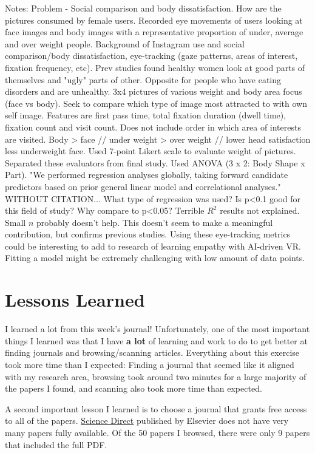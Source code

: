 \documentclass[a4paper]{article}
\begin{document}
\begin{enumerate}
    Notes: Problem - Social comparison and body dissatisfaction. How are the pictures consumed by female users. Recorded eye movements of users looking at face images and body images with a representative proportion of under, average and over weight people. Background of Instagram use and social comparison/body dissatisfaction, eye-tracking (gaze patterns, areas of interest, fixation frequency, etc). Prev studies found healthy women look at good parts of themselves and "ugly" parts of other. Opposite for people who have eating disorders and are unhealthy. 3x4 pictures of various weight and body area focus (face vs body). Seek to compare which type of image most attracted to with own self image. Features are first pass time, total fixation duration (dwell time), fixation count and visit count. Does not include order in which area of interests are visited. Body > face // under weight > over weight // lower head satisfaction less underweight face. Used 7-point Likert scale to evaluate weight of pictures. Separated these evaluators from final study. Used ANOVA (3 x 2: Body Shape x Part). "We performed regression analyses globally, taking forward candidate predictors based on prior general linear model and correlational analyses." WITHOUT CITATION... What type of regression was used? Is p<0.1 good for this field of study? Why compare to p<0.05? Terrible $R^2$ results not explained. Small $n$ probably doesn't help. This doesn't seem to make a meaningful contribution, but confirms previous studies. Using these eye-tracking metrics could be interesting to add to research of learning empathy with AI-driven VR. Fitting a model might be extremely challenging with low amount of data points. 
\end{enumerate}

\section{Lessons Learned}
I learned a lot from this week's journal! Unfortunately, one of the most important things I learned was that I have \textbf{a lot} of learning and work to do to get better at finding journals and browsing/scanning articles. Everything about this exercise took more time than I expected: Finding a journal that seemed like it aligned with my research area, browsing took around two minutes for a large majority of the papers I found, and scanning also took more time than expected.

A second important lesson I learned is to choose a journal that grants free access to all of the papers. \href{https://www.sciencedirect.com/}{Science Direct} published by Elsevier does not have very many papers fully available. Of the 50 papers I browsed, there were only 9 papers that included the full PDF.
\end{document}
